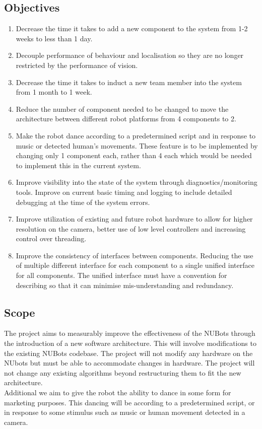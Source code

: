 \documentclass[a4paper]{article}
\begin{document}
		\subsection {Objectives}
			\begin{enumerate}
				\item Decrease the time it takes to add a new component to the system from 1-2 weeks to less than 1 day.
				\item Decouple performance of behaviour and localisation so they are no longer restricted by the performance of vision.
				\item Decrease the time it takes to induct a new team member into the system from 1 month to 1 week.
				\item Reduce the number of component needed to be changed to move the architecture between different robot platforms from 4 components to 2.
				\item Make the robot dance according to a predetermined script and in response to music or detected human’s movements. These feature is to be implemented by changing only 1 component each, rather than 4 each which would be needed to implement this in the current system. 

				\item Improve visibility into the state of the system through diagnostics/monitoring tools. Improve on current basic timing and logging to include detailed debugging at the time of the system errors.
				\item Improve utilization of existing and future robot hardware to allow for higher resolution on the camera, better use of low level controllers and increasing control over threading.
				\item Improve the consistency of interfaces between components. Reducing the use of multiple different interface for each component to a single unified interface for all components. The unified interface must have a convention for describing so that it can minimise mis-understanding and redundancy.
				

			\end{enumerate}
		\subsection {Scope}
			The project aims to measurably improve the effectiveness of the NUBots through the introduction of a new software architecture. This will involve modifications to the existing NUBots codebase. The project will not modify any hardware on the NUbots but must be able to accommodate changes in hardware. The project will not change any existing algorithms beyond restructuring them to fit the new architecture.
			\\Additional we aim to give the robot the ability to dance in some form for marketing purposes. This dancing will be according to a predetermined script, or in response to some stimulus such as music or human movement detected in a camera.
\end{document}
